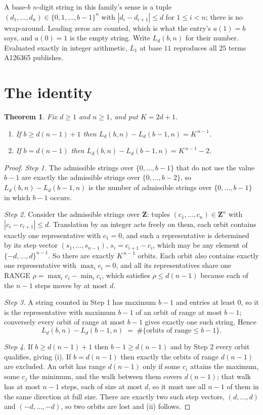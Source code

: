 \documentclass[11pt,a4paper]{article}
\theoremstyle{plain}
\newtheorem{theorem}{Theorem}
\theoremstyle{definition}
\begin{document}
A base-$b$ $n$-digit string in this family's sense is a tuple
$(d_1,\dots,d_n)\in\{0,1,\dots,b-1\}^{n}$ with $|d_i-d_{i+1}|\le d$ for $1\le i<n$; there
is no wrap-around. Leading zeros are counted, which is what the entry's $a(1)=b$ says, and
$a(0)=1$ is the empty string. Write $L_d(b,n)$ for their number. Evaluated exactly in integer
arithmetic, $L_{1}$ at base $11$ reproduces all $25$ terms A126365 publishes.

\section{The identity}

\begin{theorem}
Fix $d\ge1$ and $n\ge1$, and put $K=2d+1$.
\begin{enumerate}
\item[(i)] If $b\ge d(n-1)+1$ then $L_d(b,n)-L_d(b-1,n)=K^{\,n-1}$.
\item[(ii)] If $b=d(n-1)$ then $L_d(b,n)-L_d(b-1,n)=K^{\,n-1}-2$.
\end{enumerate}
\end{theorem}

\begin{proof}
\emph{Step 1.} The admissible strings over $\{0,\dots,b-1\}$ that do not use the value $b-1$
are exactly the admissible strings over $\{0,\dots,b-2\}$, so $L_d(b,n)-L_d(b-1,n)$ is the
number of admissible strings over $\{0,\dots,b-1\}$ in which $b-1$ occurs.

\emph{Step 2.} Consider the admissible strings over $\mathbf{Z}$: tuples
$(c_1,\dots,c_n)\in\mathbf{Z}^{n}$ with $|c_i-c_{i+1}|\le d$. Translation by an integer acts
freely on them, each orbit contains exactly one representative with $c_1=0$, and such a
representative is determined by its step vector $(s_1,\dots,s_{n-1})$, $s_i=c_{i+1}-c_i$,
which may be any element of $\{-d,\dots,d\}^{n-1}$. So there are exactly $K^{\,n-1}$ orbits.
Each orbit also contains exactly one representative with $\max_i c_i=0$, and all its
representatives share one RANGE $\rho=\max_ic_i-\min_ic_i$, which satisfies
$\rho\le d(n-1)$ because each of the $n-1$ steps moves by at most $d$.

\emph{Step 3.} A string counted in Step 1 has maximum $b-1$ and entries at least $0$, so it is
the representative with maximum $b-1$ of an orbit of range at most $b-1$; conversely every orbit
of range at most $b-1$ gives exactly one such string. Hence
\[
L_d(b,n)-L_d(b-1,n)\;=\;\#\{\text{orbits of range}\le b-1\} .
\]

\emph{Step 4.} If $b\ge d(n-1)+1$ then $b-1\ge d(n-1)$ and by Step 2 every orbit qualifies,
giving (i). If $b=d(n-1)$ then exactly the orbits of range $d(n-1)$ are excluded. An orbit has
range $d(n-1)$ only if some $c_i$ attains the maximum, some $c_j$ the minimum, and the walk
between them covers $d(n-1)$; that walk has at most $n-1$ steps, each of size at most $d$, so it
must use all $n-1$ of them in the same direction at full size. There are exactly two such step
vectors, $(d,\dots,d)$ and $(-d,\dots,-d)$, so two orbits are lost and (ii) follows.
\end{proof}
\end{document}
